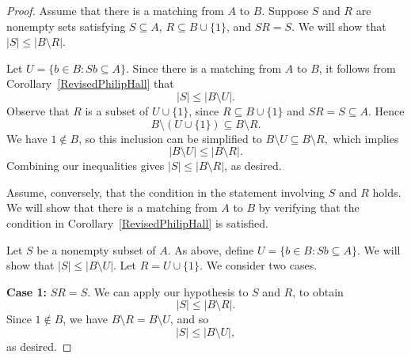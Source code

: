 \documentclass[11pt]{amsart}
\theoremstyle{definition}
\theoremstyle{remark}
\begin{document}
\begin{proof}
Assume that there is a matching from \( A \) to \( B \).  Suppose \( S \) and \( R \) are nonempty sets satisfying \( S \subseteq A \), \( R \subseteq B \cup \{ 1 \} \), and \( SR = S \). We will show that \( |S| \leq |B \setminus R|\).

Let \( U = \{ b \in B : Sb \subseteq A \} \). Since there is a matching from \( A \) to \( B \), it follows from Corollary~\ref{RevisedPhilipHall} that
\[ |S| \leq |B \setminus U|. \]  
Observe that \( R \) is a subset of \( U \cup \{ 1 \} \), since \( R \subseteq B \cup \{ 1 \} \) and \( SR = S \subseteq A \). Hence 
\[ B \setminus (U \cup \{ 1 \}) \subseteq B \setminus R. \]
We have \( 1 \notin B \), so this inclusion can be simplified to \( B \setminus U \subseteq B \setminus R, \) which implies
\[ |B \setminus U| \leq |B \setminus R|. \]
Combining our inequalities gives \( |S| \leq |B \setminus R| \), as desired.

Assume, conversely, that the condition in the statement involving \( S \) and \( R \) holds. We will show that there is a matching from \( A \) to \( B \) by verifying that the condition in Corollary~\ref{RevisedPhilipHall} is satisfied.

Let \( S \) be a nonempty subset of \( A \). As above, define \( U = \{ b \in B : Sb \subseteq A \}. \) 
We will show that \( |S| \leq |B \setminus U| \). Let \( R = U \cup \{1\} \). We consider two cases.

\medskip

\textbf{Case 1:} \( SR = S \). We can apply our hypothesis to \( S \) and \( R \), to obtain
\[
|S| \leq |B \setminus R|.
\]
Since \( 1 \notin B \), we have \( B \setminus R = B \setminus U \), and so
\[
|S| \leq |B \setminus U|,
\]
as desired.

\medskip


\end{proof}
\end{document}
